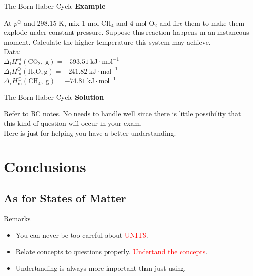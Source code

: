 \documentclass[12pt,compress]{beamer}
\begin{document}
\begin{frame}{The Born-Haber Cycle}
	\textbf{Example}
	\par At $p^\ominus$ and 298.15 K, mix 1 mol CH$_4$ and 4 mol O$_2$ and fire them to make them explode under
	constant pressure. Suppose this  reaction happens in an instaneous moment. Calculate the higher temperature this system
	may achieve. \\ 
	Data: \\ 
	$\Delta_{\mathrm{f}} H_{\mathrm{m}}^{\ominus}\left(\mathrm{CO}_{2}, \mathrm{~g}\right)=-393.51 \mathrm{~kJ} \cdot \mathrm{mol}^{-1}$ \\ 
	$\Delta_{\mathrm{f}} H_{\mathrm{m}}^{\ominus}\left(\mathrm{H}_{2} \mathrm{O}, \mathrm{g}\right)=-241.82 \mathrm{~kJ} \cdot \mathrm{mol}^{-1}$ \\ 
	$\Delta_{\mathrm{r}} H_{\mathrm{m}}^{\ominus}\left(\mathrm{CH}_{4}, \mathrm{~g}\right)=-74.81 \mathrm{~kJ} \cdot \mathrm{mol}^{-1}$
\end{frame}
\begin{frame}{The Born-Haber Cycle}
	\textbf{Solution}
	\par Refer to RC notes. No needs to handle well since there is little possibility that this kind of question will occur in your exam. \\ 
	Here is just for helping you have a better understanding.
\end{frame}


\section{Conclusions}

\subsection{As for States of Matter}
\begin{frame}{Remarks}
	\begin{itemize}
		\item You can never be too careful about \textcolor{red}{UNITS}.
		\item Relate concepts to questions properly. \textcolor{red}{Undertand the concepts}.
		\item Undertanding is always more important than just using.
	\end{itemize}
\end{frame}
\end{document}
